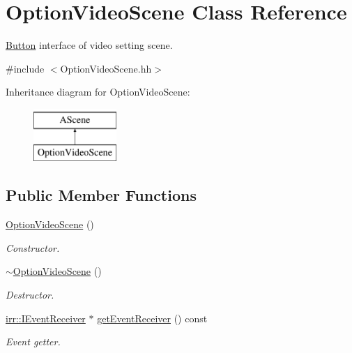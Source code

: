 \hypertarget{classOptionVideoScene}{}\section{Option\+Video\+Scene Class Reference}
\label{classOptionVideoScene}


\hyperlink{classButton}{Button} interface of video setting scene.  




{\ttfamily \#include $<$Option\+Video\+Scene.\+hh$>$}

Inheritance diagram for Option\+Video\+Scene\+:\begin{figure}[H]
\begin{center}
\leavevmode
\includegraphics[height=2.000000cm]{classOptionVideoScene}
\end{center}
\end{figure}
\subsection*{Public Member Functions}
\begin{DoxyCompactItemize}
\item 
\hyperlink{classOptionVideoScene_a4adc5d02ab700ef59733b19183769dea}{Option\+Video\+Scene} ()
\begin{DoxyCompactList}\small\item\em Constructor. \end{DoxyCompactList}\item 
\hyperlink{classOptionVideoScene_aaafd7499ea05590a0d61109ae7bcbf08}{$\sim$\+Option\+Video\+Scene} ()
\begin{DoxyCompactList}\small\item\em Destructor. \end{DoxyCompactList}\item 
\hyperlink{classirr_1_1IEventReceiver}{irr\+::\+I\+Event\+Receiver} $\ast$ \hyperlink{classOptionVideoScene_a84625e871c5176d7abc77a7f12c1472a}{get\+Event\+Receiver} () const
\begin{DoxyCompactList}\small\item\em Event getter. \end{DoxyCompactList}\end{DoxyCompactItemize}


